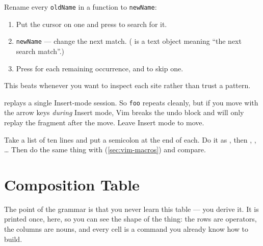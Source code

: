 \begin{eg}
	Rename every \texttt{oldName} in a function to \texttt{newName}:
	\begin{enumerate}[(1)]
		\item Put the cursor on one and press \key{*} to search for it.
		\item {}   \texttt{newName}  --- change the next
		      match. (  is a text object meaning ``the next search match''.)
		\item Press  for each remaining occurrence, and  to skip one.
	\end{enumerate}
	This beats  whenever you want to inspect each site
	rather than trust a pattern.
\end{eg}

\begin{note}
	 replays a single Insert-mode session. So   \texttt{foo}
	 repeats cleanly, but if you move with the arrow keys \emph{during}
	Insert mode, Vim breaks the undo block and  will only replay the
	fragment after the move. Leave Insert mode to move.
\end{note}

\begin{tryit}
	Take a list of ten lines and put a semicolon at the end of each. Do it as
	 \key{;}  , then  ,  ,
	\dots{} Then do the same thing with   (\autoref{sec:vim-macros}) and
	compare.
\end{tryit}

\hrulebar

\section{Composition Table}\label{sec:vim-compose}

The point of the grammar is that you never learn this table --- you derive it.
It is printed once, here, so you can see the shape of the thing: the rows are
operators, the columns are nouns, and every cell is a command you already know
how to build.

